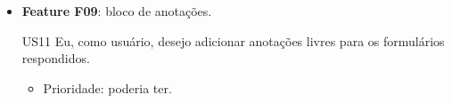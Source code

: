 \begin{itemize}
    \begin{itemize}
        \item Prioridade: poderia ter.
    \end{itemize}

    US10 Eu, como funcionário, desejo editar formulários à medida que analiso as perguntas.

    \begin{itemize}
        \item Prioridade: deveria ter.
    \end{itemize}

    \item \textbf{Feature F09}: bloco de anotações.

    US11 Eu, como usuário, desejo adicionar anotações livres para os formulários respondidos.

    \begin{itemize}
        \item Prioridade: poderia ter.
    \end{itemize}

\end{itemize}



